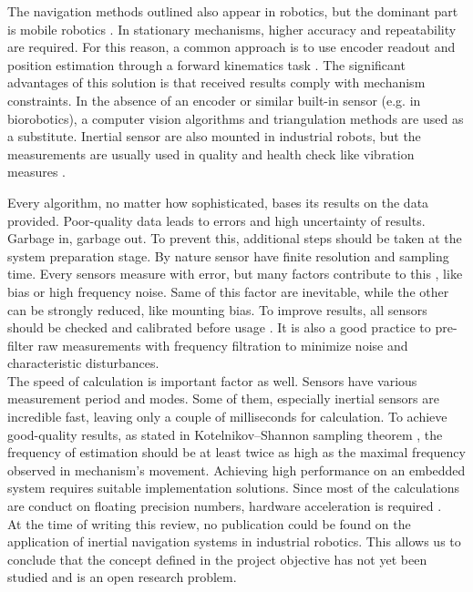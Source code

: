 The navigation methods outlined also appear in robotics, but the dominant part is mobile robotics \cite{accelerometer_mobile}. In stationary mechanisms, higher accuracy and repeatability are required. For this reason, a common approach is to use encoder readout and position estimation through a forward kinematics task \cite{forward_kinematics}. The significant advantages of this solution is that received results comply with mechanism constraints. In the absence of an encoder or similar built-in sensor (e.g. in biorobotics), a computer vision algorithms \cite{cv_positioning} \cite{cv_positioning2} and triangulation methods \cite{igps} are used as a substitute. Inertial sensor are also mounted in industrial robots, but the measurements are usually used in quality and health check like vibration measures \cite{Dogrusoz_2020}.\\

\newpage

Every algorithm, no matter how sophisticated, bases its results on the data provided. Poor-quality data leads to errors and high uncertainty of results. Garbage in, garbage out. To prevent this, additional steps should be taken at the system preparation stage. By nature sensor have finite resolution and sampling time. Every sensors measure with error, but many factors contribute to this , like bias or high frequency noise. Same of this factor are inevitable, while the other can be strongly reduced, like mounting bias. To improve results, all sensors should be checked and calibrated before usage \cite{mi13060879} \cite{Hol_2011} \cite{gyro_calib}. It is also a good practice to pre-filter raw measurements with frequency filtration \cite{BADRI20101425} to minimize noise and characteristic disturbances. \\

The speed of calculation is important factor as well. Sensors have various measurement period and modes. Some of them, especially inertial sensors are incredible fast, leaving only a couple of milliseconds for calculation. To achieve good-quality results, as stated in Kotelnikov–Shannon sampling theorem \cite{sample_theorem}, the frequency of estimation should be at least twice as high as the maximal frequency observed in mechanism's movement. Achieving high performance on an embedded system requires suitable implementation solutions. Since most of the calculations are conduct on floating precision numbers, hardware acceleration is required  \cite{fpu2} \cite{fpu}.\\

At the time of writing this review, no publication could be found on the application of inertial navigation systems in industrial robotics. This allows us to conclude that the concept defined in the project objective has not yet been studied and is an open research problem.




